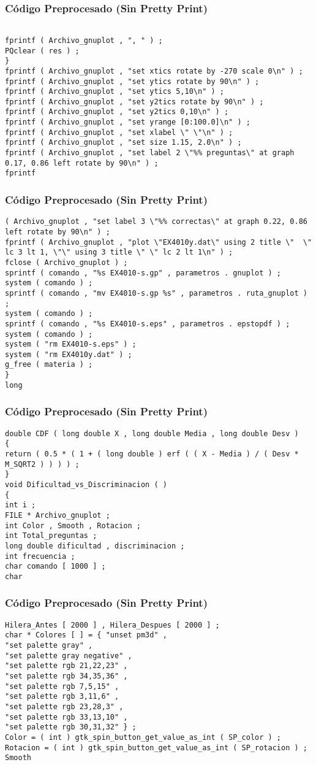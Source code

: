 \documentclass{beamer}
\begin{document}
\begin{frame}[fragile]
\frametitle{C\'odigo Preprocesado (Sin Pretty Print)}
\begin{lstlisting}[style=CStyle]

fprintf ( Archivo_gnuplot , ", " ) ; 
PQclear ( res ) ; 
} 
fprintf ( Archivo_gnuplot , "set xtics rotate by -270 scale 0\n" ) ; 
fprintf ( Archivo_gnuplot , "set ytics rotate by 90\n" ) ; 
fprintf ( Archivo_gnuplot , "set ytics 5,10\n" ) ; 
fprintf ( Archivo_gnuplot , "set y2tics rotate by 90\n" ) ; 
fprintf ( Archivo_gnuplot , "set y2tics 0,10\n" ) ; 
fprintf ( Archivo_gnuplot , "set yrange [0:100.0]\n" ) ; 
fprintf ( Archivo_gnuplot , "set xlabel \" \"\n" ) ; 
fprintf ( Archivo_gnuplot , "set size 1.15, 2.0\n" ) ; 
fprintf ( Archivo_gnuplot , "set label 2 \"%% preguntas\" at graph 0.17, 0.86 left rotate by 90\n" ) ; 
fprintf \end{lstlisting}
\end{frame}
\begin{frame}[fragile]
\frametitle{C\'odigo Preprocesado (Sin Pretty Print)}
\begin{lstlisting}[style=CStyle]
( Archivo_gnuplot , "set label 3 \"%% correctas\" at graph 0.22, 0.86 left rotate by 90\n" ) ; 
fprintf ( Archivo_gnuplot , "plot \"EX4010y.dat\" using 2 title \"  \" lc 3 lt 1, \"\" using 3 title \" \" lc 2 lt 1\n" ) ; 
fclose ( Archivo_gnuplot ) ; 
sprintf ( comando , "%s EX4010-s.gp" , parametros . gnuplot ) ; 
system ( comando ) ; 
sprintf ( comando , "mv EX4010-s.gp %s" , parametros . ruta_gnuplot ) ; 
system ( comando ) ; 
sprintf ( comando , "%s EX4010-s.eps" , parametros . epstopdf ) ; 
system ( comando ) ; 
system ( "rm EX4010-s.eps" ) ; 
system ( "rm EX4010y.dat" ) ; 
g_free ( materia ) ; 
} 
long \end{lstlisting}
\end{frame}
\begin{frame}[fragile]
\frametitle{C\'odigo Preprocesado (Sin Pretty Print)}
\begin{lstlisting}[style=CStyle]
double CDF ( long double X , long double Media , long double Desv ) 
{ 
return ( 0.5 * ( 1 + ( long double ) erf ( ( X - Media ) / ( Desv * M_SQRT2 ) ) ) ) ; 
} 
void Dificultad_vs_Discriminacion ( ) 
{ 
int i ; 
FILE * Archivo_gnuplot ; 
int Color , Smooth , Rotacion ; 
int Total_preguntas ; 
long double dificultad , discriminacion ; 
int frecuencia ; 
char comando [ 1000 ] ; 
char \end{lstlisting}
\end{frame}
\begin{frame}[fragile]
\frametitle{C\'odigo Preprocesado (Sin Pretty Print)}
\begin{lstlisting}[style=CStyle]
Hilera_Antes [ 2000 ] , Hilera_Despues [ 2000 ] ; 
char * Colores [ ] = { "unset pm3d" , 
"set palette gray" , 
"set palette gray negative" , 
"set palette rgb 21,22,23" , 
"set palette rgb 34,35,36" , 
"set palette rgb 7,5,15" , 
"set palette rgb 3,11,6" , 
"set palette rgb 23,28,3" , 
"set palette rgb 33,13,10" , 
"set palette rgb 30,31,32" } ; 
Color = ( int ) gtk_spin_button_get_value_as_int ( SP_color ) ; 
Rotacion = ( int ) gtk_spin_button_get_value_as_int ( SP_rotacion ) ; 
Smooth \end{lstlisting}
\end{frame}
\end{document}
